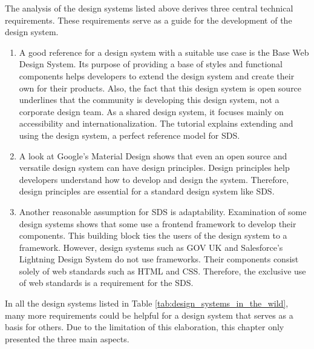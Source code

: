 The analysis of the design systems listed above derives three central technical requirements. These requirements serve as a guide for the development of the design system.
\begin{enumerate}
    \item A good reference for a design system with a suitable use case is the Base Web Design System. Its purpose of providing a base of styles and functional components helps developers to extend the design system and create their own for their products. Also, the fact that this design system is open source underlines that the community is developing this design system, not a corporate design team. As a shared design system, it focuses mainly on accessibility and internationalization. The tutorial explains extending and using the design system, a perfect reference model for \ac{SDS}.  
    \item A look at Google's Material Design shows that even an open source and versatile design system can have design principles. Design principles help developers understand how to develop and design the system. Therefore, design principles are essential for a standard design system like \ac{SDS}. 
    \item Another reasonable assumption for \ac{SDS} is adaptability. Examination of some design systems shows that some use a frontend framework to develop their components. This building block ties the users of the design system to a framework. However, design systems such as GOV UK and Salesforce's Lightning Design System do not use frameworks. Their components consist solely of web standards such as \ac{HTML} and \ac{CSS}. Therefore, the exclusive use of web standards is a requirement for the \ac{SDS}. 
\end{enumerate}

In all the design systems listed in Table \ref{tab:design_systems_in_the_wild}, many more requirements could be helpful for a design system that serves as a basis for others. Due to the limitation of this elaboration, this chapter only presented the three main aspects. \\




